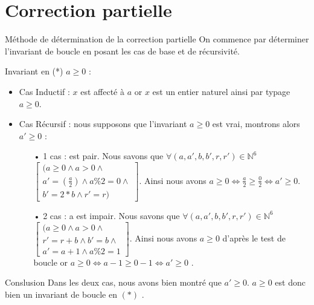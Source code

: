 \documentclass[12pt,a4paper]{report}
\begin{document}
\section{Correction partielle}
\begin{mybox}{Méthode de détermination de la correction partielle}
On commence par déterminer l'invariant de boucle en posant les cas de base
et de récursivité.
\end{mybox}
\begin{flushleft}
Invariant en (*) $  a\geq 0 $  : \\
\begin{itemize}
\item Cas Inductif :  $x$ est affect\'{e} \`{a} $a$ or $x$ est un entier naturel ainsi par typage $a\ge 0$.
\item Cas Récursif : nous supposons que l'invariant  $a\ge 0$ est vrai, montrons alors $ a' \geq 0 $ :
\begin{itemize}
\item[•]  1 cas :  est pair. Nous savons que $\forall(a,a',b,b',r,r')\in \mathbb{N}^{6}$ $\left[ \begin{array}{c}(a\ge 0\wedge a>0\wedge \\
   a '=(\frac{a}{2})\wedge a\%2=0 \wedge \\
b '=2*b\wedge r '=r)\end{array}
\right]$. Ainsi nous avons $a\ge 0\Leftrightarrow \frac{a}{2}\ge \frac{0}{2}\Leftrightarrow a ' \ge 0$.
\item[•] 2 cas : a est impair. Nous savons que $\forall(a,a',b,b',r,r')\in \mathbb{N}^{6}$ $\left[ \begin{array}{c}(a\ge 0\wedge a>0\wedge \\
   r '= r+b\wedge b'=b  \wedge \\
a '=a+1\wedge a\%2=1\end{array}
\right]$. Ainsi nous avons  $a\ge 0$ d’après le test de boucle or  $  a\geq 0  \Leftrightarrow a-1 \ge 0-1 \Leftrightarrow a' \ge 0$ .
\bigskip
\end{itemize}
\end{itemize}
\begin{Cas1}{Conslusion}
 Dans les deux cas, nous avons bien montré que  $ a' \ge 0 $. $a \geq 0$ est donc bien un invariant de boucle en $(*)$ .
\end{Cas1}
\end{flushleft}
\end{document}
